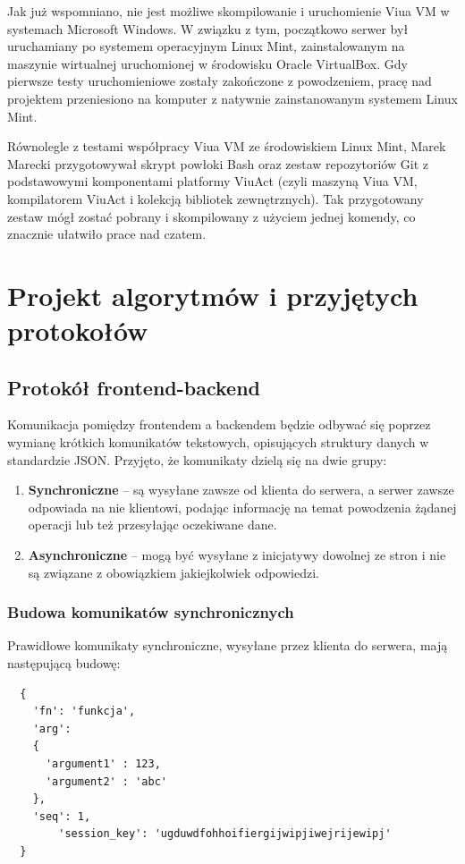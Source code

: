 Jak już wspomniano, nie jest możliwe skompilowanie i uruchomienie Viua
VM w systemach Microsoft Windows. W związku z tym, początkowo serwer był
uruchamiany po systemem operacyjnym Linux Mint, zainstalowanym na maszynie
wirtualnej uruchomionej w środowisku Oracle VirtualBox. Gdy pierwsze testy
uruchomieniowe zostały zakończone z powodzeniem, pracę nad projektem
przeniesiono na komputer z natywnie zainstanowanym systemem Linux Mint.

Równolegle z testami współpracy Viua VM ze środowiskiem Linux Mint, Marek
Marecki przygotowywał skrypt powłoki Bash oraz zestaw repozytoriów Git z
podstawowymi komponentami platformy ViuAct (czyli maszyną Viua VM, kompilatorem
ViuAct i kolekcją bibliotek zewnętrznych). Tak przygotowany zestaw mógł zostać
pobrany i skompilowany z użyciem jednej komendy, co znacznie ułatwiło prace
nad czatem.

\section{Projekt algorytmów i przyjętych protokołów}

\subsection{Protokół frontend-backend}
Komunikacja pomiędzy frontendem a backendem będzie odbywać się poprzez wymianę
krótkich komunikatów tekstowych, opisujących struktury danych w standardzie
JSON. Przyjęto, że komunikaty dzielą się na dwie grupy:

\begin{enumerate}
	\item \textbf{Synchroniczne} -- są wysyłane zawsze od klienta do serwera, a
	serwer zawsze odpowiada na nie klientowi, podając informację na temat
	powodzenia żądanej operacji lub też przesyłając oczekiwane dane.

	\item \textbf{Asynchroniczne} -- mogą być wysyłane z inicjatywy dowolnej ze
	stron i nie są związane z obowiązkiem jakiejkolwiek odpowiedzi.
\end{enumerate}

\subsubsection{Budowa komunikatów synchronicznych}
Prawidłowe komunikaty synchroniczne, wysyłane przez klienta do serwera, mają
następującą budowę:
\begin{lstlisting}
  {
    'fn': 'funkcja',
    'arg':
    {
      'argument1' : 123,
      'argument2' : 'abc'
    },
    'seq': 1,
		'session_key': 'ugduwdfohhoifiergijwipjiwejrijewipj'
  }
\end{lstlisting}

